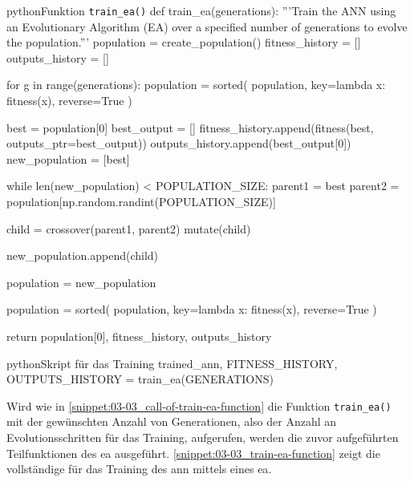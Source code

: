 \begin{snippet}[htp]
    \centering
    \begin{codebox}{python}{Funktion \texttt{train\_ea()}}
        def train_ea(generations):
            '''Train the ANN using an Evolutionary Algorithm (EA) over a specified number of generations to evolve the population.'''
            population = create_population()
            fitness_history = []
            outputs_history = []

            for g in range(generations):
                population = sorted(
                    population,
                    key=lambda x: fitness(x),
                    reverse=True
                )

                best = population[0]
                best_output = []
                fitness_history.append(fitness(best, outputs_ptr=best_output))
                outputs_history.append(best_output[0])
                new_population = [best]

                while len(new_population) < POPULATION_SIZE:
                    parent1 = best
                    parent2 = population[np.random.randint(POPULATION_SIZE)]

                    child = crossover(parent1, parent2)
                    mutate(child)

                    new_population.append(child)

                population = new_population

            population = sorted(
                population,
                key=lambda x: fitness(x),
                reverse=True
            )

            return population[0], fitness_history, outputs_history
    \end{codebox}
    \caption{Implementierung der Funktion \texttt{train\_ea()}}
    \label{snippet:03-03_train-ea-function}
\end{snippet}

\begin{snippet}[htp]
    \centering
    \begin{codebox}{python}{Skript für das Training}
        trained_ann, FITNESS_HISTORY, OUTPUTS_HISTORY = train_ea(GENERATIONS)
    \end{codebox}
    \caption{Aufruf der Funktion \texttt{train\_ea()}}
    \label{snippet:03-03_call-of-train-ea-function}
\end{snippet}

Wird wie in \autoref{snippet:03-03_call-of-train-ea-function} die Funktion \texttt{train\_ea()} mit der gewünschten Anzahl von Generationen, also der Anzahl an Evolutionsschritten für das Training, aufgerufen, werden die zuvor aufgeführten Teilfunktionen des \Gls{ea} ausgeführt. \autoref{snippet:03-03_train-ea-function} zeigt die vollständige  für das Training des \Gls{ann} mittels eines \Gls{ea}.

